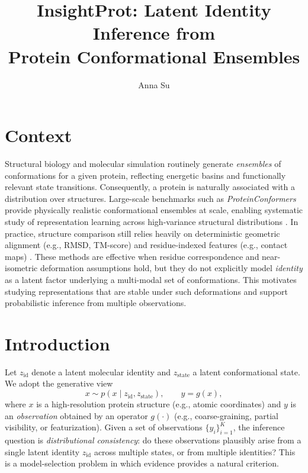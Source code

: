 \documentclass[nonacm, sigplan,10pt]{acmart}
\title{InsightProt: Latent Identity Inference from \\Protein Conformational Ensembles}
\author{Anna Su}
\affiliation{%
  \institution{Yale University}
  \city{New Haven}
  \state{CT}
  \country{USA}
}
\begin{document}
\maketitle

\section{Context}
Structural biology and molecular simulation routinely generate \emph{ensembles} of conformations for a given protein, reflecting energetic basins and functionally relevant state transitions.
Consequently, a protein is naturally associated with a distribution over structures.
Large-scale benchmarks such as \emph{ProteinConformers} provide physically realistic conformational ensembles at scale, enabling systematic study of representation learning across high-variance structural distributions \cite{ProteinConformers2025}.
In practice, structure comparison still relies heavily on deterministic geometric alignment (e.g., RMSD, TM-score) and residue-indexed features (e.g., contact maps) \cite{ZhangSkolnick2004TMscore}.
These methods are effective when residue correspondence and near-isometric deformation assumptions hold, but they do not explicitly model \emph{identity} as a latent factor underlying a multi-modal set of conformations.
This motivates studying representations that are stable under such deformations and support probabilistic inference from multiple observations.

\section{Introduction}
Let $z_{\mathrm{id}}$ denote a latent molecular identity and $z_{\mathrm{state}}$ a latent conformational state.
We adopt the generative view
\begin{equation}
x \sim p(x \mid z_{\mathrm{id}}, z_{\mathrm{state}}), \qquad
y = g(x),
\end{equation}
where $x$ is a high-resolution protein structure (e.g., atomic coordinates) and $y$ is an \emph{observation} obtained by an operator $g(\cdot)$ (e.g., coarse-graining, partial visibility, or featurization).
Given a set of observations $\{y_i\}_{i=1}^K$, the inference question is \emph{distributional consistency}:
do these observations plausibly arise from a single latent identity $z_{\mathrm{id}}$ across multiple states, or from multiple identities?
This is a model-selection problem in which evidence provides a natural criterion.
\end{document}

